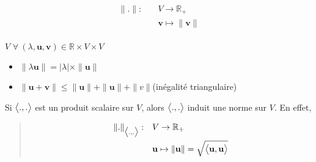 \documentclass[letterpaper,11pt,english]{sphinxmanual}
\begin{document}
\begin{equation}\label{equation:chapter2:chapter2:14}
\begin{split}\begin{aligned}
    \|.\|: \quad&V\rightarrow{\mathbb{R_{+}}}\\
    &\mathbf{v}\mapsto \|\mathbf{v}\|\end{aligned}\end{split}
\end{equation}
\begin{DUlineblock}{0em}
\item[] \(V\)
\(\forall\  (\lambda, \mathbf{u}, \mathbf{v})\in \mathbb{R}\times V\times V\)
\end{DUlineblock}
\begin{itemize}
\item {} 
\sphinxAtStartPar
\(\|\lambda\mathbf{u}\| = |\lambda| \times \|\mathbf{u}\|\)

\item {} 
\sphinxAtStartPar
\(\|\mathbf{u} + \mathbf{v} \| \leq \|\mathbf{u}\| + \|\mathbf{u}\| + \|v\|\)(inégalité
triangulaire)

\end{itemize}

\sphinxAtStartPar
{} Si \(\big{<}.,.\big{>}\) est un produit scalaire sur
\(V\), alors \(\big{<}.,.\big{>}\) induit une norme sur
\(V\). En effet,

\begin{DUlineblock}{0em}
\item[] 
\end{DUlineblock}
\begin{quote}
\begin{equation}\label{equation:chapter2:chapter2:15}
\begin{split}\begin{aligned}
    \|.\|_{\big{<}.,.\big{>}}:\quad&V\rightarrow{\mathbb{R_{+}}}\\
    & \mathbf{u}\mapsto \|\mathbf{u}\|=\sqrt{\big{<}\mathbf{u},\mathbf{u}\big{>}}\end{aligned}\end{split}
\end{equation}\end{quote}
\end{document}
